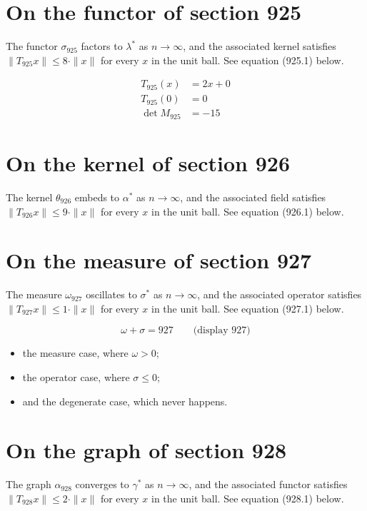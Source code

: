 \documentclass{article}
\begin{document}
\section{On the functor of section 925}
The functor $\sigma_{925}$ factors to $\lambda^{*}$ as $n \to \infty$,
and the associated kernel satisfies $\|T_{925} x\| \leq 8 \cdot \|x\|$
for every $x$ in the unit ball. See equation (925.1) below.

\begin{align}
T_{925}(x) &= 2 x + 0 \\
T_{925}(0) &= 0 \\
\det M_{925} &= -15
\end{align}

\section{On the kernel of section 926}
The kernel $\theta_{926}$ embeds to $\alpha^{*}$ as $n \to \infty$,
and the associated field satisfies $\|T_{926} x\| \leq 9 \cdot \|x\|$
for every $x$ in the unit ball. See equation (926.1) below.

\section{On the measure of section 927}
The measure $\omega_{927}$ oscillates to $\sigma^{*}$ as $n \to \infty$,
and the associated operator satisfies $\|T_{927} x\| \leq 1 \cdot \|x\|$
for every $x$ in the unit ball. See equation (927.1) below.

$$
\omega + \sigma = 927 \qquad \text{(display 927)}
$$

\begin{itemize}
  \item the measure case, where $\omega > 0$;
  \item the operator case, where $\sigma \leq 0$;
  \item and the degenerate case, which never happens.
\end{itemize}

\section{On the graph of section 928}
The graph $\alpha_{928}$ converges to $\gamma^{*}$ as $n \to \infty$,
and the associated functor satisfies $\|T_{928} x\| \leq 2 \cdot \|x\|$
for every $x$ in the unit ball. See equation (928.1) below.
\end{document}

